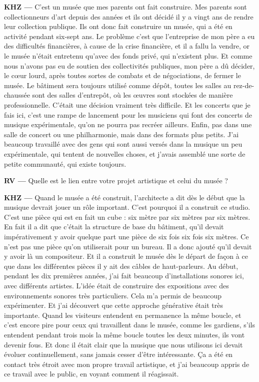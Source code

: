 \documentclass[a4paper,12pt]{article}
\begin{document}
\textbf{KHZ ---} C'est un musée que mes parents ont fait construire. Mes parents sont collectionneurs d'art depuis des années et ils ont décidé il y a vingt ans de rendre leur collection publique. Ils ont donc fait construire un musée, qui a été en activité pendant six-sept ans. Le problème c'est que l'entreprise de mon père a eu des difficultés financières, à cause de la crise financière, et il a fallu la vendre, or le musée n'était entretenu qu'avec des fonds privé, qui n'existent plus. Et comme nous n'avons pas eu de soutien des collectivités publiques, mon père a dû décider, le cœur lourd, après toutes sortes de combats et de négociations, de fermer le musée. Le bâtiment sera toujours utilisé comme dépôt, toutes les salles au rez-de-chaussée sont des salles d'entrepôt, où les œuvres sont stockées de manière professionnelle. C'était une décision vraiment très difficile. Et les concerts que je fais ici, c'est une rampe de lancement pour les musiciens qui font des concerts de musique expérimentale, qu'on ne pourra pas recréer ailleurs. Enfin, pas dans une salle de concert ou une philharmonie, mais dans des formats plus petits. J'ai beaucoup travaillé avec des gens qui sont aussi versés dans la musique un peu expérimentale, qui tentent de nouvelles choses, et j'avais assemblé une sorte de petite communauté, qui existe toujours.

\textbf{RV ---} Quelle est le lien entre votre projet artistique et celui du musée ?

\textbf{KHZ ---} Quand le musée a été construit, l'architecte a dit dès le début que la musique devrait jouer un rôle important. C'est pourquoi il a construit ce studio. C'est une pièce qui est en fait un cube : six mètre par six mètres par six mètres. En fait il a dit que c'était la structure de base du bâtiment, qu'il devait impérativement y avoir quelque part une pièce de six fois six fois six mètres. Ce n'est pas une pièce qu'on utiliserait pour un bureau. Il a donc ajouté qu'il devait y avoir là un compositeur. Et il a construit le musée dès le départ de façon à ce que dans les différentes pièces il y ait des câbles de haut-parleurs. Au début, pendant les dix premières années, j'ai fait beaucoup d'installations sonores ici, avec différents artistes. L'idée était de construire des expositions avec des environnements sonores très particuliers. Cela m'a permis de beaucoup expérimenter. Et j'ai découvert que cette approche générative était très importante. Quand les visiteurs entendent en permanence la même boucle, et c'est encore pire pour ceux qui travaillent dans le musée, comme les gardiens, s'ils entendent pendant trois mois la même boucle toutes les deux minutes, ils vont devenir fous. Et donc il était clair que la musique que nous utilisons ici devait évoluer continuellement, sans jamais cesser d'être intéressante. Ça a été en contact très étroit avec mon propre travail artistique, et j'ai beaucoup appris de ce travail avec le public, en voyant comment il réagissait.
\end{document}
